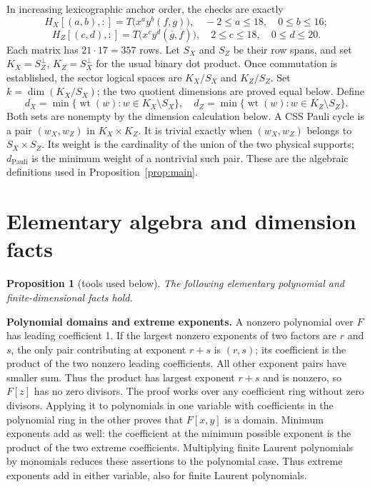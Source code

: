 \documentclass{article}
\newtheorem{proposition}{Proposition}
\DeclareMathOperator{\wt}{wt}
\begin{document}
In increasing lexicographic anchor order, the checks are exactly
\begin{equation}
  H_X[(a,b), {:}] = T\bigl(x^a y^b (f, g)\bigr), \quad -2 \le a \le 18, \quad 0 \le b \le 16;
\end{equation}
\begin{equation}
  H_Z[(c,d), {:}] = T\bigl(x^c y^d (\overline{g}, \overline{f})\bigr),
  \quad 2 \le c \le 18, \quad 0 \le d \le 20.
\end{equation}
Each matrix has \(21 \cdot 17 = 357\) rows. Let \(S_X\) and \(S_Z\) be their row spans, and set
\(K_X = S_Z^{\perp}\), \(K_Z = S_X^{\perp}\) for the usual binary dot product. Once commutation is
established, the sector logical spaces are \(K_X/S_X\) and \(K_Z/S_Z\). Set
\(k = \dim(K_X/S_X)\); the two quotient dimensions are proved equal below. Define
\begin{equation}
  d_X = \min\{\wt(w) : w \in K_X \setminus S_X\}, \quad
  d_Z = \min\{\wt(w) : w \in K_Z \setminus S_Z\}.
\end{equation}
Both sets are nonempty by the dimension calculation below. A CSS Pauli cycle is a pair
\((w_X, w_Z)\) in \(K_X \times K_Z\). It is trivial exactly when \((w_X, w_Z)\) belongs to
\(S_X \times S_Z\). Its weight is the cardinality of the union of the two physical supports;
\(d_{\text{Pauli}}\) is the minimum weight of a nontrivial such pair. These are the algebraic
definitions used in Proposition~\ref{prop:main}.

\section{Elementary algebra and dimension facts}\label{sec:tools}

\begin{proposition}[tools used below]\label{prop:tools}
  The following elementary polynomial and finite-dimensional facts hold.
\end{proposition}

\textbf{Polynomial domains and extreme exponents.} A nonzero polynomial over \(F\) has leading
coefficient 1. If the largest nonzero exponents of two factors are \(r\) and \(s\), the only pair
contributing at exponent \(r + s\) is \((r,s)\); its coefficient is the product of the two nonzero
leading coefficients. All other exponent pairs have smaller sum. Thus the product has largest
exponent \(r + s\) and is nonzero, so \(F[z]\) has no zero divisors. The proof works over any
coefficient ring without zero divisors. Applying it to polynomials in one variable with
coefficients in the polynomial ring in the other proves that \(F[x,y]\) is a domain. Minimum
exponents add as well: the coefficient at the minimum possible exponent is the product of the two
extreme coefficients. Multiplying finite Laurent polynomials by monomials reduces these
assertions to the polynomial case. Thus extreme exponents add in either variable, also for finite
Laurent polynomials.
\end{document}
